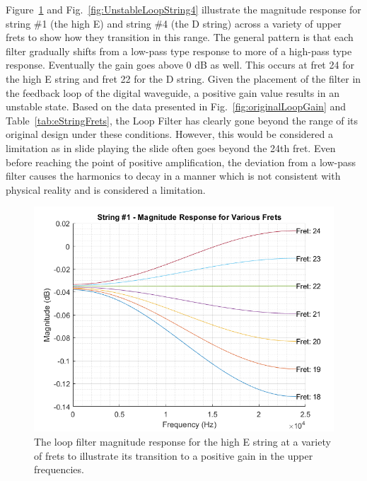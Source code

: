 \documentclass[../main.tex]{subfiles}
\begin{document}
Figure~\ref{fig:UnstableLoopString1} and Fig.~\ref{fig:UnstableLoopString4} illustrate the magnitude response for string \#1 (the high E) and string \#4 (the D string) across a variety of upper frets to show how they transition in this range. The general pattern is that each filter gradually shifts from a low-pass type response to more of a high-pass type response. Eventually the gain goes above 0 dB as well. This occurs at fret 24 for the high E string and fret 22 for the D string. Given the placement of the filter in the feedback loop of the digital waveguide, a positive gain value results in an unstable state. Based on the data presented in Fig.~\ref{fig:originalLoopGain} and Table~\ref{tab:eStringFrets}, the Loop Filter has clearly gone beyond the range of its original design under these conditions. However, this would be considered a limitation as in slide playing the slide often goes beyond the 24th fret. Even before reaching the point of positive amplification, the deviation from a low-pass filter causes the harmonics to decay in a manner which is not consistent with physical reality and is considered a limitation. 

\begin{figure}[h]
    \centering
    \includegraphics[scale=.65]{./images/plots/Unstable Loop Filter - String 1.png}
    \caption{The loop filter magnitude response for the high E string at a variety of frets to illustrate its transition to a positive gain in the upper frequencies.}
    \label{fig:UnstableLoopString1}
\end{figure}
\end{document}
